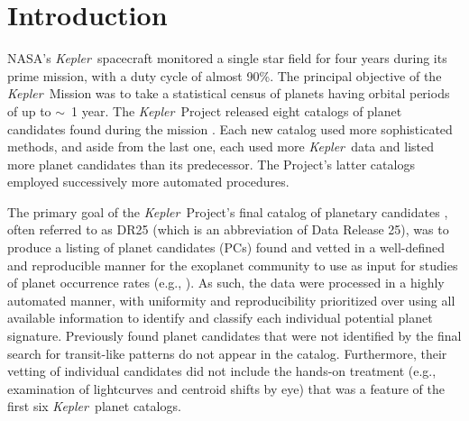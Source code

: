 \documentclass{aastex62}
\newcommand{\ik}{{\it Kepler~}}
\begin{document}
\section{Introduction}\label{sec:intro}

NASA's \ik spacecraft monitored a single star field for four years during its prime mission, with a duty cycle of almost 90\%. The principal objective of the \ik Mission was to take a statistical census of planets having orbital periods of up to $\sim$~1 year. The \ik Project released eight catalogs of planet candidates found during the mission \citep{Borucki:2011a,Borucki:2011b,Batalha:2013,Burke:2014,Rowe:2015,Mullally:2015,Coughlin:2016,Thompson:2018}. Each new catalog used more sophisticated methods, and aside from the last one, each used more \ik data and listed more planet candidates than its predecessor. The Project's latter catalogs employed successively more automated procedures.%

The primary goal of the \ik Project's final catalog of planetary candidates \citep{Thompson:2018}, often referred to as DR25 (which is an abbreviation of Data Release 25), was to produce a listing of planet candidates (PCs) found and vetted in a well-defined and reproducible manner for the exoplanet community to use as input for studies of planet occurrence rates (e.g., \citealt{Hsu:2019}).  As such, the data were processed in a highly automated manner, with uniformity and reproducibility prioritized over using all available information to identify and classify each individual potential planet signature.  {Previously found planet candidates that were not identified by the final search for transit-like patterns do not appear in the \cite{Thompson:2018} catalog. Furthermore, their vetting of individual candidates did not include the hands-on treatment (e.g., examination of lightcurves and centroid shifts by eye) that was a feature of the first six \ik planet catalogs.}
\end{document}
